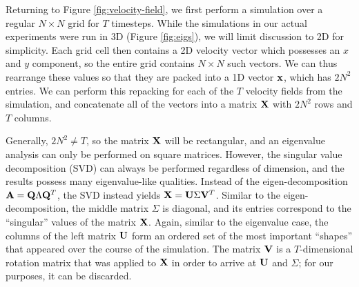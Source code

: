 \documentclass[11pt]{article}
\begin{document}

Returning to Figure \ref{fig:velocity-field}, we first perform a simulation over a regular $N \times N$ grid for $T$ timesteps. While the simulations in our actual experiments were run in 3D (Figure \ref{fig:eigs}), we will limit discussion to 2D for simplicity. Each grid cell then contains a 2D velocity vector which possesses an $x$ and $y$ component, so the entire grid contains $N \times N$ such vectors. We can thus rearrange these values so that they are packed into a 1D vector $\mathbf{x}$, which has $2N^2$ entries. We can perform this repacking for each of the $T$ velocity fields from the simulation, and concatenate all of the vectors into a matrix $\mathbf{X}$ with $2N^2$ rows and $T$ columns.

Generally, $2N^2 \neq T$, so the matrix $\mathbf{X}$ will be rectangular, and an eigenvalue analysis can only be performed on square matrices. However, the singular value decomposition (SVD) can always be performed regardless of dimension, and the results possess many eigenvalue-like qualities. Instead of the eigen-decomposition $\mathbf{A} = \mathbf{Q} \Lambda \mathbf{Q}^T$, the SVD instead yields $\mathbf{X} = \mathbf{U} \Sigma \mathbf{V}^T$. Similar to the eigen-decomposition, the middle matrix $\Sigma$ is diagonal, and its entries correspond to the ``singular'' values of the matrix $\mathbf{X}$. Again, similar to the eigenvalue case, the columns of the left matrix $\mathbf{U}$ form an ordered set of the most important ``shapes'' that appeared over the course of the simulation. The matrix $\mathbf{V}$ is a $T$-dimensional rotation matrix that was applied to $\mathbf{X}$ in order to arrive at $\mathbf{U}$ and $\Sigma$; for our purposes, it can be discarded.
\end{document}
